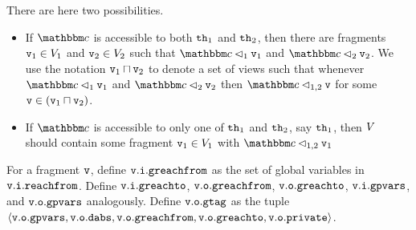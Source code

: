 There are  here two possibilities.
\begin{itemize}
\item If $\cell$ is accessible to both ${\tt th}_1$ and ${\tt th}_2$, then
  there are fragments $\mathtt{v}_1 \in V_1$ and $\mathtt{v}_2 \in V_2$
  such that $\cell \satfrag{1} \frag_1$ and $\cell \satfrag{2} \frag_2$.
  We use the notation $\mathtt{v}_1 \sqcap \mathtt{v}_2$ to denote a set of views such that
  whenever $\cell \satfrag{1} \frag_1$ and $\cell \satfrag{2} \frag_2$ then
  $\cell \satfrag{1,2} \frag$ for some $\mathtt{v} \in (\mathtt{v}_1 \sqcap \mathtt{v}_2)$.
\item If $\cell$ is accessible to only one of ${\tt th}_1$ and ${\tt th}_2$,
  say ${\tt th}_1$, then $V$ should contain some fragment
  $\mathtt{v}_1 \in V_1$ with $\cell \satfrag{1,2} \frag_1$
\end{itemize}
For a fragment $\mathtt{v}$, define
$\mathtt{v}.\mathtt{i}.\mathtt{greachfrom}$ as the set of global variables in
$\mathtt{v}.\mathtt{i}.\mathtt{reachfrom}$. Define
$\mathtt{v}.\mathtt{i}.\mathtt{greachto}$,
$\mathtt{v}.\mathtt{o}.\mathtt{greachfrom}$,
$\mathtt{v}.\mathtt{o}.\mathtt{greachto}$,
$\mathtt{v}.\mathtt{i}.\mathtt{gpvars}$, and
$\mathtt{v}.\mathtt{o}.\mathtt{gpvars}$
analogously.
Define $\mathtt{v}.\mathtt{o}.\mathtt{gtag}$ as the tuple
$\left\langle\mathtt{v}.\mathtt{o}.\mathtt{gpvars},\mathtt{v}.\mathtt{o}.\mathtt{dabs},\mathtt{v}.\mathtt{o}.\mathtt{greachfrom},\mathtt{v}.\mathtt{o}.\mathtt{greachto},\mathtt{v}.\mathtt{o}.\mathtt{private}\right\rangle$.

 

